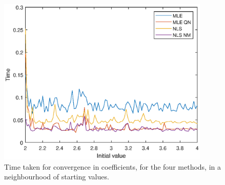 \documentclass[12pt,a4paper]{article}
\begin{document}
\begin{figure}[h!]
\centering
\includegraphics[width=0.9\textwidth]{fig1.eps}
\caption{Time taken for convergence in coefficients, for the four methods, in a neighbourhood of starting values.}
\end{figure}
\end{document}
